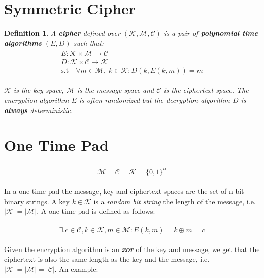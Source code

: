 \documentclass[11pt,a4paper]{report}
\newtheorem{definition}{Definition}
\begin{document}
\section{Symmetric Cipher}
\begin{definition}
A \textbf{cipher} defined over $( \mathscr{K,M,C} )$ is a pair of \textbf{polynomial time algorithms} $(E,D)$ such that:
\begin{gather}
	\begin{gathered}
		E : \mathscr{K} \times \mathscr{M} \rightarrow \mathscr{C} \\
		D : \mathscr{K} \times \mathscr{C} \rightarrow \mathscr{K} \\
		\textrm{s.t} \quad \forall m \in \mathscr{M},\; k \in \mathscr{K} : D(k, E(k, m)) = m
	\end{gathered}
\end{gather}


\noindent
$\mathscr{K}$ is the key-space, $\mathscr{M}$ is the message-space and $\mathscr{C}$ is the ciphertext-space. The encryption algorithm $E$ is often randomized but the decryption algorithm $D$ is \emph{\textbf{always}} deterministic.
\end{definition}


\section{One Time Pad\textsuperscript{\cite{1}}}

\begin{gather}
	\begin{gathered}
		\mathscr{M} = \mathscr{C} = \mathscr{K} = \{0,1\}^n			
	\end{gathered}	
\end{gather}

\noindent
In a one time pad the message, key and ciphertext spaces are the set of n-bit binary strings. A key $k \in \mathscr{K}$ is a \emph{random bit string} the length of the message, i.e. $|\mathscr{K}|=|\mathscr{M}|$. A one time pad is defined as follows:

\begin{gather}
	\begin{gathered}
		\exists. c \in \mathscr{C}, k \in \mathscr{K}, m \in \mathscr{M}: E(k, m) = k \oplus m = c
	\end{gathered}	
\end{gather}

Given the encryption algorithm is an \emph{\textbf{xor}} of the key and message, we get that the ciphertext is also the same length as the key and the message, i.e. $|\mathscr{K}|=|\mathscr{M}|=|\mathscr{C}|$. An example:
\end{document}

